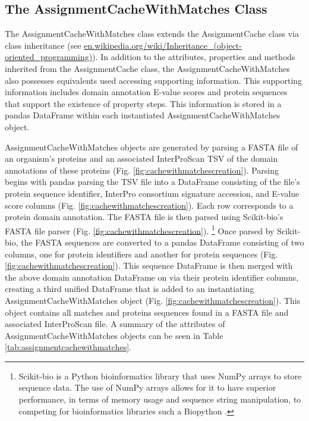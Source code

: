 \subsection{The AssignmentCacheWithMatches Class}

The AssignmentCacheWithMatches class extends the AssignmentCache class via class inheritance \cite{snyder1986encapsulation} (see \href{en.wikipedia.org/wiki/Inheritance\_(object-oriented\_programming)}{en.wikipedia.org/wiki/Inheritance\_(object-oriented\_programming)}). In addition to the attributes, properties and methods inherited from the AssignmentCache class, the AssignmentCacheWithMatches also possesses equivalents used accessing supporting information. This supporting information includes domain annotation E-value scores and protein sequences that support the existence of property steps. This information is stored in a pandas DataFrame within each instantiated AssignmentCacheWithMatches object. 

AssignmentCacheWithMatches objects are generated by parsing a FASTA file \cite{pearson19905} of an organism's proteins and an associated InterProScan TSV of the domain annotations of these proteins (Fig. \ref{fig:cachewithmatchescreation}). Parsing begins with pandas parsing the TSV file into a DataFrame consisting of the file's protein sequence identifier, InterPro consortium signature accession, and E-value score columns (Fig. \ref{fig:cachewithmatchescreation}). Each row corresponds to a protein domain annotation. The FASTA file is then parsed using Scikit-bio's FASTA file parser (Fig. \ref{fig:cachewithmatchescreation})\cite{scikitbio}. \footnote{Scikit-bio is a Python bioinformatics library that uses NumPy arrays to store sequence data. The use of NumPy arrays allows for it to have superior performance, in terms of memory usage and sequence string manipulation, to competing for bioinformatics libraries such a Biopython \cite{cock2009biopython}.} Once parsed by Scikit-bio, the FASTA sequences are converted to a pandas DataFrame consisting of two columns, one for protein identifiers and another for protein sequences (Fig. \ref{fig:cachewithmatchescreation}). This sequence DataFrame is then merged with the above domain annotation DataFrame on via their protein identifier columns, creating a third unified DataFrame that is added to an instantiating AssignmentCacheWithMatches object (Fig. \ref{fig:cachewithmatchescreation}). This object contains all matches and proteins sequences found in a FASTA file and associated InterProScan file. A summary of the attributes of AssignmentCacheWithMatches objects can be seen in Table \ref{tab:assignmentcachewithmatches}.

